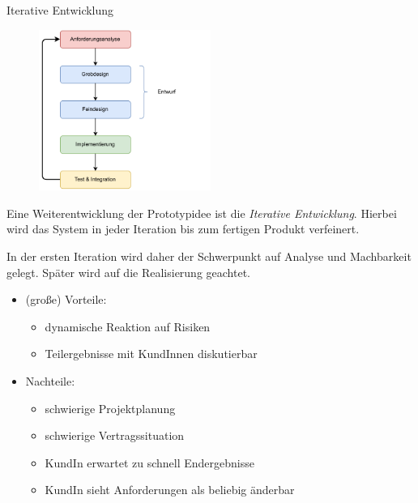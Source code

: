 \begin{defi}{Iterative Entwicklung}
    \begin{figure}
        \begin{center}
            \includegraphics[width=0.5\textwidth]{includes/figures/defi_iterative_development.pdf}
        \end{center}
    \end{figure}

    Eine Weiterentwicklung der Prototypidee ist die \emph{Iterative Entwicklung}.
    Hierbei wird das System in jeder Iteration bis zum fertigen Produkt verfeinert.

    In der ersten Iteration wird daher der Schwerpunkt auf Analyse und Machbarkeit gelegt.
    Später wird auf die Realisierung geachtet.

    \begin{itemize}
        \item (große) Vorteile:
              \begin{itemize}
                  \item dynamische Reaktion auf Risiken
                  \item Teilergebnisse mit KundInnen diskutierbar
              \end{itemize}
        \item Nachteile:
              \begin{itemize}
                  \item schwierige Projektplanung
                  \item schwierige Vertragssituation
                  \item KundIn erwartet zu schnell Endergebnisse
                  \item KundIn sieht Anforderungen als beliebig änderbar
              \end{itemize}
    \end{itemize}
\end{defi}

